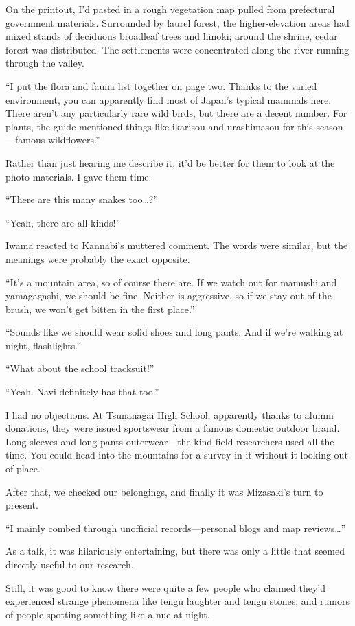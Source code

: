 \documentclass[
    a4paper,
    12pt,
    twoside,
    openany,
    UTF8,
    fontset=windows
]{ctexbook}
\begin{document}
On the printout, I'd pasted in a rough vegetation map pulled from prefectural government materials. Surrounded by laurel forest, the higher-elevation areas had mixed stands of deciduous broadleaf trees and hinoki; around the shrine, cedar forest was distributed. The settlements were concentrated along the river running through the valley.

``I put the flora and fauna list together on page two. Thanks to the varied environment, you can apparently find most of Japan's typical mammals here. There aren't any particularly rare wild birds, but there are a decent number. For plants, the guide mentioned things like ikarisou and urashimasou for this season---famous wildflowers.''

Rather than just hearing me describe it, it'd be better for them to look at the photo materials. I gave them time.

``There are this many snakes too\dots?''

``Yeah, there are all kinds!''

Iwama reacted to Kannabi's muttered comment. The words were similar, but the meanings were probably the exact opposite.

``It's a mountain area, so of course there are. If we watch out for mamushi and yamagagashi, we should be fine. Neither is aggressive, so if we stay out of the brush, we won't get bitten in the first place.''

``Sounds like we should wear solid shoes and long pants. And if we're walking at night, flashlights.''

``What about the school tracksuit!''

``Yeah. Navi definitely has that too.''

I had no objections. At Tsunanagai High School, apparently thanks to alumni donations, they were issued sportswear from a famous domestic outdoor brand. Long sleeves and long-pants outerwear---the kind field researchers used all the time. You could head into the mountains for a survey in it without it looking out of place.

After that, we checked our belongings, and finally it was Mizasaki's turn to present.

``I mainly combed through unofficial records---personal blogs and map reviews\dots''

As a talk, it was hilariously entertaining, but there was only a little that seemed directly useful to our research.

Still, it was good to know there were quite a few people who claimed they'd experienced strange phenomena like tengu laughter and tengu stones, and rumors of people spotting something like a nue at night.
\end{document}
